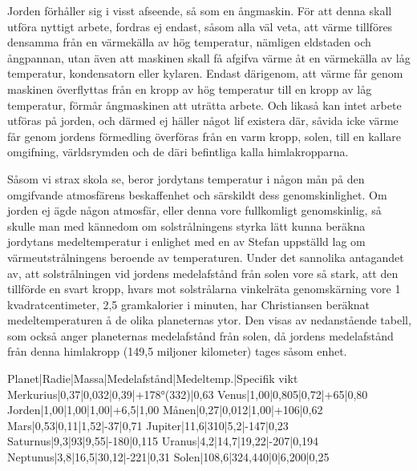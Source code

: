 \documentclass[a4paper, 12pt, oneside, swedish]{article}
\begin{document}
Jorden förhåller sig i visst afseende, så som en ångmaskin. För att denna skall utföra nyttigt arbete, fordras ej endast, såsom alla väl veta, att värme tillföres densamma från en värmekälla av hög temperatur, nämligen eldstaden och ångpannan, utan även att maskinen skall få afgifva värme åt en värmekälla av låg temperatur, kondensatorn eller kylaren. Endast därigenom, att värme får genom maskinen överflyttas från en kropp av hög temperatur till en kropp av låg temperatur, förmår ångmaskinen att uträtta arbete. Och likaså kan intet arbete utföras på jorden, och därmed ej häller något lif existera där, såvida icke värme får genom jordens förmedling överföras från en varm kropp, solen, till en kallare omgifning, världsrymden och de däri befintliga kalla himlakropparna.

Såsom vi strax skola se, beror jordytans temperatur i någon mån på den omgifvande atmosfärens beskaffenhet och särskildt dess genomskinlighet. Om jorden ej ägde någon atmosfär, eller denna vore fullkomligt genomskinlig, så skulle man med kännedom om solstrålningens styrka lätt kunna beräkna jordytans medeltemperatur i enlighet med en av Stefan uppställd lag om värmeutstrålningens beroende av temperaturen. Under det sannolika antagandet av, att solstrålningen vid jordens medelafstånd från solen vore så stark, att den tillförde en svart kropp, hvars mot solstrålarna vinkelräta genomskärning vore 1 kvadratcentimeter, 2,5 gramkalorier i minuten, har Christiansen beräknat medeltemperaturen å de olika planeternas ytor. Den visas av nedanstående tabell, som också anger planeternas medelafstånd från solen, då jordens medelafstånd från denna himlakropp (149,5 miljoner kilometer) tages såsom enhet.

Planet|Radie|Massa|Medelafstånd|Medeltemp.|Specifik vikt  
Merkurius|0,37|0,032|0,39|+178°(332)|0,63  
Venus|1,00|0,805|0,72|+65|0,80  
Jorden|1,00|1,00|1,00|+6,5|1,00  
Månen|0,27|0,012|1,00|+106|0,62  
Mars|0,53|0,11|1,52|-37|0,71  
Jupiter|11,6|310|5,2|-147|0,23  
Saturnus|9,3|93|9,55|-180|0,115  
Uranus|4,2|14,7|19,22|-207|0,194  
Neptunus|3,8|16,5|30,12|-221|0,31  
Solen|108,6|324,440|0|6,200|0,25  
\end{document}
